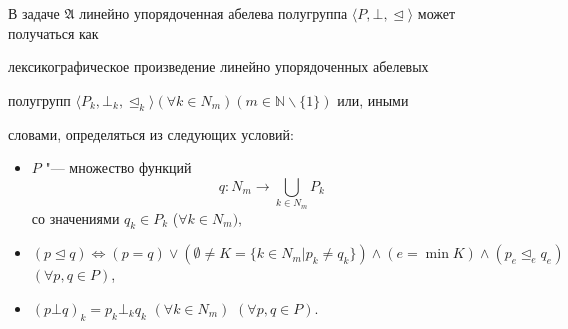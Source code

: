 \begin{remark}[3] В задаче \hyperlink{ovch:zadmm}{$\mathfrak{A}$} линейно упорядоченная абелева полугруппа $\langle

P,\bot,\trianglelefteq \rangle $ может получаться как

лексикографическое произведение линейно упорядоченных абелевых

полугрупп $\langle P_k,\bot _k,\trianglelefteq_k \rangle

(\forall k\in N_m )(m\in \mathbb{N}\backslash \{1\})$ или, иными

словами, определяться из следующих условий:



\begin{itemize}

\item[--]

$P$ "--- множество функций $$q:  N_m \longrightarrow \bigcup

\limits_{k\in N_m} P_k$$ со значениями $q_k \in P_k$ ($ \forall k

\in N_m),$



\item[--]

$(p\trianglelefteq q)\Leftrightarrow(p=q)\vee (\emptyset

\ne K=\{k\in N_m \vert p_k \ne q_k \})\wedge (e={\min K}) \wedge

(p_e\trianglelefteq_e q_e)$ $(\forall p,q\in P)$,



\item[--]

$(p\bot q)_k =p_k \bot _k q_k $ $(\forall k\in N_m )$ $(\forall

p,q\in P)$.





\end{itemize}

\end{remark}



\smallskip



\hypertarget{ovch:zam4}{}



